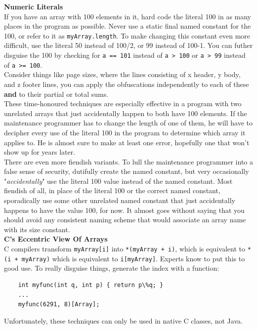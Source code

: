 \documentclass[11pt,twoside,a4paper]{article}
\begin{document}
\textbf{Numeric Literals}~\\
If you have an array with 100 elements in it, hard code the literal 100 in as many places in the program as possible. Never use a static final named constant for the 100, or refer to it as \texttt{myArray.length}. To make changing this constant even more difficult, use the literal 50 instead of 100/2, or 99 instead of 100-1. You can futher disguise the 100 by checking for \texttt{a == 101} instead of \texttt{a > 100} or \texttt{a > 99} instead of \texttt{a >= 100}. ~\\

Consider things like page sizes, where the lines consisting of x header, y body, and z footer lines, you can apply the obfuscations independently to each of these \textbf{and} to their partial or total sums. ~\\

These time-honoured techniques are especially effective in a program with two unrelated arrays that just accidentally happen to both have 100 elements. If the maintenance programmer has to change the length of one of them, he will have to decipher every use of the literal 100 in the program to determine which array it applies to. He is almost sure to make at least one error, hopefully one that won't show up for years later. ~\\

There are even more fiendish variants. To lull the maintenance programmer into a false sense of security, dutifully create the named constant, but very occasionally "\emph{accidentally}" use the literal 100 value instead of the named constant. Most fiendish of all, in place of the literal 100 or the correct named constant, sporadically use some other unrelated named constant that just accidentally happens to have the value 100, for now. It almost goes without saying that you should avoid any consistent naming scheme that would associate an array name with its size constant. ~\\

\textbf{C's Eccentric View Of Arrays}~\\
C compilers transform \texttt{myArray[i]} into \texttt{*(myArray + i)}, which is equivalent to \texttt{*(i + myArray)} which is equivalent to \texttt{i[myArray]}. Experts know to put this to good use. To really disguise things, generate the index with a function: 
\begin{verbatim}
	int myfunc(int q, int p) { return p\%q; } 
	... 
	myfunc(6291, 8)[Array];
\end{verbatim}
Unfortunately, these techniques can only be used in native C classes, not Java.~\\ 
\end{document}
